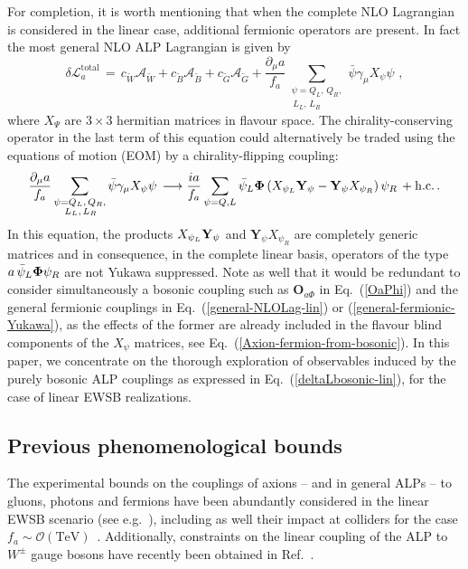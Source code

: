 \documentclass[11pt]{article}
\newcommand{\A}{\mathcal{A}}
\renewcommand{\O}{\mathbf{O}}
\newcommand{\de}{\partial}
\newcommand{\hc}{\mathrm{h.c.}}
\newcommand{\beq}{\begin{equation}}
\newcommand{\eeq}{\end{equation}}
\renewcommand{\[}{\begin{equation}}
\renewcommand{\]}{\end{equation}}
\newcommand{\LL}{\mathscr{L}}
\begin{document}
For completion, it is worth mentioning that when the complete NLO Lagrangian is considered in the linear case, additional fermionic operators are present. In fact the most general NLO ALP Lagrangian is given by ~\cite{Georgi:1986df,Choi:1986zw, Salvio:2013iaa}
 \beq
 \delta\LL_a^\text{total}\,=\,c_{\tilde{W}}\A_{\tilde{W}}+c_{\tilde{B}}\A_{\tilde{B}}+c_{\tilde{G}}\A_{\tilde{G}}+ \frac{\de_\mu a}{f_a}\sum_{\substack{\psi=Q_L,\,Q_R, \\\,L_L,\,L_R}} \bar\psi \gamma_\mu X_\psi \psi \,\,,
\label{general-NLOLag-lin}
\eeq
%
where  $X_\Psi$ are  $3\times3$ hermitian matrices in flavour space. The chirality-conserving operator in the last term of this equation could alternatively be traded using the equations of motion (EOM) by a chirality-flipping coupling:
\[
 \frac{\de_\mu a}{f_a}\sum_{\substack{\psi=Q_L,\,Q_R, \\\,L_L,\,L_R}} \bar\psi \gamma_\mu X_\psi \psi \, \longrightarrow  \frac{ia}{f_a}
 \sum_{\psi= Q, L} \bar{\psi}_L  {\bf{\Phi}} \left( X_{\psi_L} {\bf Y}_\psi - \mathbf{Y}_\psi X_{\psi_R} \right) \psi_R \, + \hc \,.
 \label{general-fermionic-Yukawa}
\]
In this equation, the  products $X_{\psi_L} {\bf Y}_\psi$ and $\mathbf{Y}_\psi X_{\psi_R}$ are completely generic matrices and in consequence,  in the complete linear basis, operators of the type $a\,\bar{\psi}_L {\bf{\Phi}} \psi_R  $ are not Yukawa suppressed. Note as well that it would be redundant to consider simultaneously a bosonic coupling such as $\O_{a\Phi}$ in Eq.~(\ref{OaPhi}) and the general fermionic couplings in Eq.~(\ref{general-NLOLag-lin}) or (\ref{general-fermionic-Yukawa}), as the effects of the former are already included in the flavour blind components of the $X_\psi$ matrices, see Eq.~(\ref{Axion-fermion-from-bosonic}). 
In this paper, we concentrate on the thorough exploration of observables induced by the purely bosonic ALP  couplings as expressed in Eq.~(\ref{deltaLbosonic-lin}), for the case of linear EWSB realizations. 

\subsection{ Previous phenomenological bounds}
The experimental bounds on the couplings of axions -- and in general ALPs --  to gluons, photons and fermions have been abundantly 
considered in the linear EWSB scenario (see e.g.~\cite{Agashe:2014kda,Bjorken:1984mt,Vinyoles:2015aba,Raffelt:2006cw,Friedland:2012hj,Ayala:2014pea,Khachatryan:2014rra,Aad:2015zva,Krnjaic:2015mbs,Clarke:2013aya,Aprile:2014eoa,Viaux:2013lha}), including as well their impact at colliders for the case $f_a\sim\mathcal{O}(\text{TeV})$~\cite{Mimasu:2014nea, Jaeckel:2015jla}. Additionally, constraints on the linear coupling of the ALP to $W^\pm$ gauge bosons have recently been obtained in Ref.~\cite{Dolan:2014ska,Izaguirre:2016dfi}.
\end{document}

